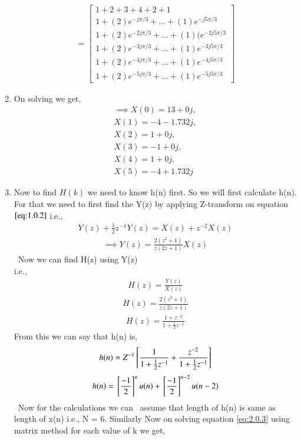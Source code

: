 \documentclass[journal,12pt,twocolumn]{IEEEtran}
\renewcommand\thesection{\arabic{section}}
\begin{document}
\begin{enumerate}[label=\thesection.\arabic*.,ref=\thesection.\theenumi]
\begin{align}
=
\begin{bmatrix}
1 +2+3+4+2+1 \\ 1+ (2)e^{-j\pi /3} + ... + (1)e^{-j5\pi /3}\\ 1 + (2)e^{-2j\pi /3} + ... +(1)(e^{-2j5\pi /3}\\ 1 + (2)e^{-3j\pi /3} + ... + (1)e^{-3j5\pi /3}\\ 1 + (2)e^{-4j\pi /3} + ... + (1)e^{-4j5\pi /3}\\ 1 + (2)e^{-5j\pi /3} + ... + (1)e^{-5j5\pi /3}
\end{bmatrix}
\end{align}
\item
On solving we get,
\begin{align}
    \implies X(0) = 13 + 0j,\\
    X(1) = -4 - 1.732j,\\
    X(2) = 1 + 0j,
    \\
    X(3) = -1 + 0j,\\
    X(4) = 1 + 0j,\\
    X(5) = -4 + 1.732j
\end{align}
\item
Now to find $H(k)$ we need to know h(n) first. So we will first calculate h(n). For that we need to first find the Y(z) by applying Z-transform on equation $\eqref{eq:1.0.2}$ i.e.,
\begin{align}
    Y(z) + \frac{1}{2}z^{-1}Y(z)=X(z) + z^{-2}X(z)
\end{align}
\begin{align}
    \implies Y(z)=\frac{2(z^2+1)}{z(2z+1)}X(z)
\end{align}
\
Now we can find H(z) using Y(z)\\
 i.e.,
\begin{align}
    H(z) = \frac{Y(z)}{X(z)}
\end{align}
\begin{align}
 H(z) = \frac{2(z^2+1)}{z(2z+1)}
\end{align}
\begin{align}
 H(z) = \frac{1+z^{-2}}{1+\frac{1}{2}z^{-1}}
\end{align}
From this we can say that h(n) is,
\begin{align}
 h(n)= Z^{-1}{}\left[\frac{1}{1+\frac{1}{2}z^{-1}} + \frac{z^{-2}}{1+\frac{1}{2}z^{-1}}\right]
\end{align}
\begin{align}
 h(n)={}\left[\frac{-1}{2}\right]^nu(n) + {}\left[\frac{-1}{2}\right]^{n-2}u(n-2)
\end{align}
\
Now for the calculations we can \
 assume that length of h(n) is same as length of x(n) i.e., N = 6.
Similarly Now on solving  equation \eqref{eq:2.0.3} using matrix method for each value of k we get,


\end{enumerate}
\end{document}
